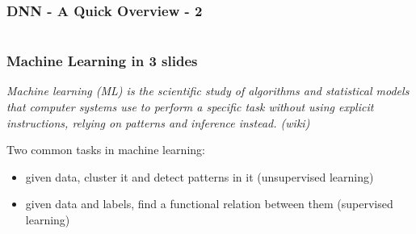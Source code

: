 \documentclass[12pt,fleqn]{beamer}
\begin{document}
\begin{frame}
	\frametitle{DNN - A Quick Overview - 2}
	
	\begin{center}
		\begin{columns}
		
		\end{columns}
	\end{center}
		
		\vspace{5mm}
		\end{frame}

\begin{frame}\frametitle{{Machine Learning in 3 slides}}

{\em Machine learning (ML) is the scientific study of algorithms and statistical models that computer systems use to perform a specific task without using explicit instructions, relying on patterns and inference instead. (wiki)}

\bigskip\pause

Two common tasks in machine learning:
\begin{itemize}
\item given data, cluster it and detect patterns in it (unsupervised learning)
\item given data and labels, find a functional relation between them (supervised learning)
\end{itemize}



\end{frame}
\end{document}
